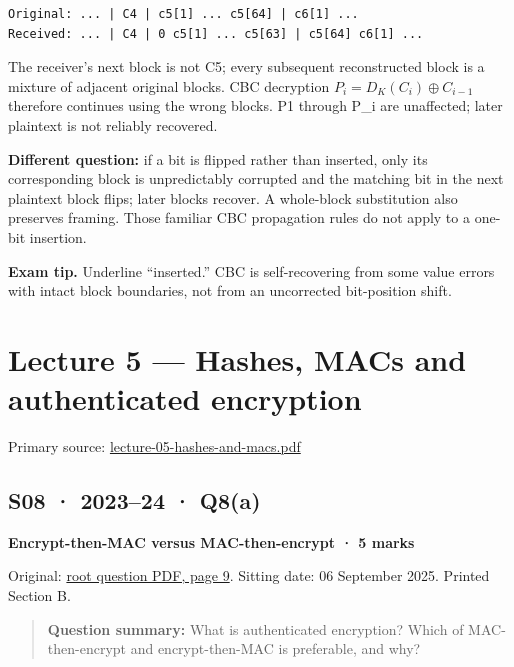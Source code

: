 \documentclass[11pt,a4paper]{article}
\begin{document}
\begin{Verbatim}[breaklines=true,breakanywhere=true,fontsize=\small,frame=single,rulecolor=\color{PanelBorder}]
Original: ... | C4 | c5[1] ... c5[64] | c6[1] ...
Received: ... | C4 | 0 c5[1] ... c5[63] | c5[64] c6[1] ...
\end{Verbatim}

The receiver’s next block is not C5; every subsequent reconstructed block is a mixture of adjacent original blocks. CBC decryption \(P_i=D_K(C_i)\oplus C_{i-1}\) therefore continues using the wrong blocks. P1 through P\_i are unaffected; later plaintext is not reliably recovered.


\textbf{Different question:} if a bit is flipped rather than inserted,\allowbreak{} only its corresponding block is unpredictably corrupted and the matching bit in the next plaintext block flips; later blocks recover. A whole-block substitution also preserves framing. Those familiar CBC propagation rules do not apply to a one-bit insertion.



{\color{ForestGreen}\textbf{Exam tip.} Underline “inserted.” CBC is self-recovering from some value errors with intact block boundaries,\allowbreak{} not from an uncorrected bit-position shift.}



\clearpage
\section{Lecture 5 — Hashes,\allowbreak{} MACs and authenticated encryption}

Primary source: \href{../slides/lecture-05-hashes-and-macs.pdf}{lecture-05-hashes-and-macs.\allowbreak{}pdf}




\subsection{S08 · 2023–24 · Q8(a)}\label{s08}

\textbf{Encrypt-then-MAC versus MAC-then-encrypt · 5 marks}


Original: \href{../../CSE405-Security_Merged.pdf\#page=9}{root question PDF,\allowbreak{} page 9}. Sitting date: 06 September 2025. Printed Section B.



\begin{quote}\small

\textbf{Question summary:} What is authenticated encryption? Which of MAC-then-encrypt and encrypt-then-MAC is preferable,\allowbreak{} and why?



\end{quote}
\end{document}
